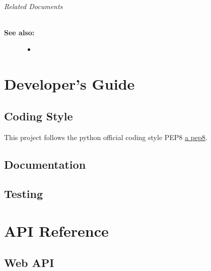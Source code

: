 \documentclass[letterpaper,10pt,english]{sphinxmanual}
\begin{document}
\subparagraph{Related Documents}
\label{user_guide:id6}\begin{description}
\item[{\textbf{See also:}}] \leavevmode\begin{itemize}
\item {} 

\end{itemize}

\end{description}


\chapter{Developer's Guide}
\label{index:developer-s-guide}

\section{Coding Style}
\label{developer_guide:coding-style}\label{developer_guide::doc}\label{developer_guide:developer-guide}
This project follows the python official coding style PEP8 \href{http://legacy.python.org/dev/peps/pep-0008/}{a pep8}.


\section{Documentation}
\label{developer_guide:documentation}\label{developer_guide:a-pep8}

\section{Testing}
\label{developer_guide:testing}

\chapter{API Reference}
\label{index:api-reference}

\section{Web API}
\label{api_ref::doc}\label{api_ref:web-api}
\end{document}
